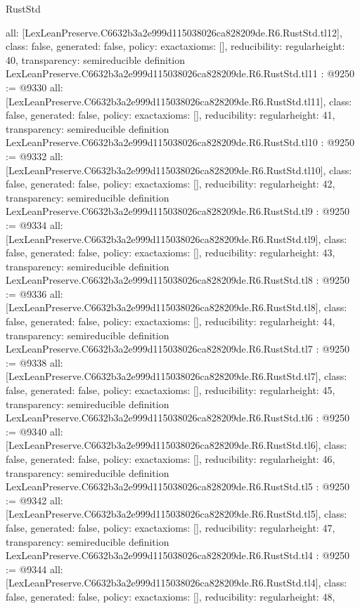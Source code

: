 \begin{lexlean}{RustStd}
\begin{coremodule}
{  all: [LexLeanPreserve.C6632b3a2e999d115038026ca828209de.R6.RustStd.tl12],
  class: false,
  generated: false,
  policy: exact{axioms: []},
  reducibility: regular{height: 40},
  transparency: semireducible
}
definition LexLeanPreserve.C6632b3a2e999d115038026ca828209de.R6.RustStd.tl11 : @9250 := @9330 {
  all: [LexLeanPreserve.C6632b3a2e999d115038026ca828209de.R6.RustStd.tl11],
  class: false,
  generated: false,
  policy: exact{axioms: []},
  reducibility: regular{height: 41},
  transparency: semireducible
}
definition LexLeanPreserve.C6632b3a2e999d115038026ca828209de.R6.RustStd.tl10 : @9250 := @9332 {
  all: [LexLeanPreserve.C6632b3a2e999d115038026ca828209de.R6.RustStd.tl10],
  class: false,
  generated: false,
  policy: exact{axioms: []},
  reducibility: regular{height: 42},
  transparency: semireducible
}
definition LexLeanPreserve.C6632b3a2e999d115038026ca828209de.R6.RustStd.tl9 : @9250 := @9334 {
  all: [LexLeanPreserve.C6632b3a2e999d115038026ca828209de.R6.RustStd.tl9],
  class: false,
  generated: false,
  policy: exact{axioms: []},
  reducibility: regular{height: 43},
  transparency: semireducible
}
definition LexLeanPreserve.C6632b3a2e999d115038026ca828209de.R6.RustStd.tl8 : @9250 := @9336 {
  all: [LexLeanPreserve.C6632b3a2e999d115038026ca828209de.R6.RustStd.tl8],
  class: false,
  generated: false,
  policy: exact{axioms: []},
  reducibility: regular{height: 44},
  transparency: semireducible
}
definition LexLeanPreserve.C6632b3a2e999d115038026ca828209de.R6.RustStd.tl7 : @9250 := @9338 {
  all: [LexLeanPreserve.C6632b3a2e999d115038026ca828209de.R6.RustStd.tl7],
  class: false,
  generated: false,
  policy: exact{axioms: []},
  reducibility: regular{height: 45},
  transparency: semireducible
}
definition LexLeanPreserve.C6632b3a2e999d115038026ca828209de.R6.RustStd.tl6 : @9250 := @9340 {
  all: [LexLeanPreserve.C6632b3a2e999d115038026ca828209de.R6.RustStd.tl6],
  class: false,
  generated: false,
  policy: exact{axioms: []},
  reducibility: regular{height: 46},
  transparency: semireducible
}
definition LexLeanPreserve.C6632b3a2e999d115038026ca828209de.R6.RustStd.tl5 : @9250 := @9342 {
  all: [LexLeanPreserve.C6632b3a2e999d115038026ca828209de.R6.RustStd.tl5],
  class: false,
  generated: false,
  policy: exact{axioms: []},
  reducibility: regular{height: 47},
  transparency: semireducible
}
definition LexLeanPreserve.C6632b3a2e999d115038026ca828209de.R6.RustStd.tl4 : @9250 := @9344 {
  all: [LexLeanPreserve.C6632b3a2e999d115038026ca828209de.R6.RustStd.tl4],
  class: false,
  generated: false,
  policy: exact{axioms: []},
  reducibility: regular{height: 48},
}
\end{coremodule}
\end{lexlean}
